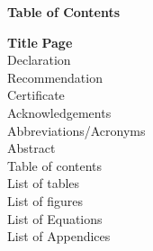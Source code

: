 \begin{titlepage}
\label{front:contents}
    \thispagestyle{plain} %

    \begin{center}
        {\fontsize{14}{18}\selectfont \textbf{Table of Contents}}
    \end{center}

    \vspace*{48pt} 

    \noindent
    {\fontsize{12}{14}\selectfont \textbf{Title}} \hfill {\fontsize{12}{14}\selectfont \textbf{Page}} \\[10pt]

    \noindent Declaration \hfill \pageref{front:declaration} \\
    \noindent Recommendation \hfill \pageref{front:recommendation} \\
    \noindent Certificate \hfill \pageref{front:certificate} \\
    \noindent Acknowledgements \hfill \pageref{front:acknowledgements} \\
    \noindent Abbreviations/Acronyms \hfill \pageref{front:abbreviations} \\
    \noindent Abstract \hfill \pageref{front:abstract} \\
    \noindent Table of contents \hfill \pageref{front:contents} \\
    \noindent List of tables \hfill \pageref{front:tables} \\
    \noindent List of figures \hfill \pageref{front:figures} \\
    \noindent List of Equations \hfill \pageref{front:equations} \\
    \noindent List of Appendices \hfill \pageref{front:appendices} \\[-2pt]


\end{titlepage}
